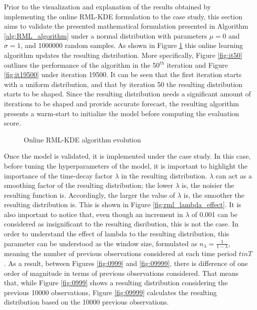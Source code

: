 Prior to the visualization and explanation of the results obtained by implementing the online RML-KDE formulation to the case study, this section aims to validate the presented mathematical formulation presented in Algorithm \ref{alg:RML_algorithm} under a normal distribution with parameters $\mu = 0$ and $\sigma = 1$, and 1000000 random samples. As shown in Figure \ref{fig:rml_evolution} this online learning algorithm updates the resulting distribution.  More specifically, Figure \ref{fig:it50} outlines the performance of the algorithm in the 50$^{th}$ iteration and Figure \ref{fig:it19500} under iteration 19500. It can be seen that the first iteration starts with a uniform distribution, and that by iteration 50 the resulting distribution starts to be shaped. Since the resulting distribution needs a significant amount of iterations to be shaped and provide accurate forecast, the resulting algorithm presents a warm-start to initialize the model before computing the evaluation score.

\begin{figure}[ht!]
\centering     %
{}
\caption{Online RML-KDE algorithm evolution}
\label{fig:rml_evolution}
\end{figure}

Once the model is validated, it is implemented under the case study. In this case, before tuning the hyperparameters of the model, it is important to highlight the importance of the time-decay factor $\lambda$ in the resulting distribution. $\lambda$ can act as a smoothing factor of the resulting distribution; the lower $\lambda$ is, the noisier the resulting function is. Accordingly, the larger the value of $\lambda$ is, the smoother the resulting distribution is. This is shown in Figure \ref{fig:rml_lambda_effect}. It is also important to notice that, even though an increment in $\lambda$ of 0.001 can be considered as insignificant to the resulting disribution, this is not the case. In order to understand the effect of lambda to the resulting distribution, this parameter can be understood as the window size, formulated as $n_{\lambda} = \frac{1}{1-\lambda}$, meaning the number of previous observations considered at each time period $t in T$. As a result, between Figures \ref{fig:0999} and \ref{fig:09999}, there is difference of one order of magnitude in terms of previous observations considered. That means that, while Figure \ref{fig:0999} shows a resulting distribution considering the previous 10000 observations, Figure \ref{fig:09999} calculates the resulting distribution based on the 10000 previous observations. 


